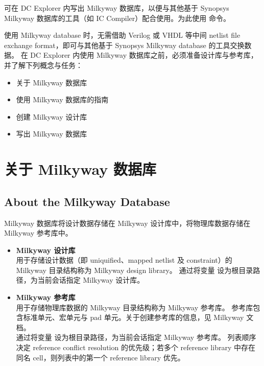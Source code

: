 \label{chap:mw}

可在 DC Explorer 内写出 Milkyway 数据库，以便与其他基于 Synopsys Milkyway 数据库的工具（如 IC Compiler）配合使用。为此使用  命令。

使用 Milkyway database 时，无需借助 Verilog 或 VHDL 等中间 netlist file exchange format，即可与其他基于 Synopsys Milkyway database 的工具交换数据。
在 DC Explorer 内使用 Milkyway 数据库之前，必须准备设计库与参考库，并了解下列概念与任务：
\begin{itemize}
  \item 关于 Milkyway 数据库
  \item 使用 Milkyway 数据库的指南
  \item 创建 Milkyway 设计库
  \item 写出 Milkyway 数据库
\end{itemize}

\section{关于 Milkyway 数据库}
\subsection*{About the Milkyway Database}

Milkyway 数据库将设计数据存储在 Milkyway 设计库中，将物理库数据存储在 Milkyway 参考库中。
\begin{itemize}
  \item \textbf{Milkyway 设计库}\\
        用于存储设计数据（即 uniquified、mapped netlist 及 constraint）的 Milkyway 目录结构称为 Milkyway design library。
        通过将变量  设为根目录路径，为当前会话指定 Milkyway 设计库。
  \item \textbf{Milkyway 参考库}\\
        用于存储物理库数据的 Milkyway 目录结构称为 Milkyway 参考库。
        参考库包含标准单元、宏单元与 pad 单元。关于创建参考库的信息，见 Milkyway 文档。\\
        通过将变量  设为根目录路径，为当前会话指定 Milkyway 参考库。
        列表顺序决定 reference conflict resolution 的优先级；若多个 reference library 中存在同名 cell，则列表中的第一个 reference library 优先。
\end{itemize}

